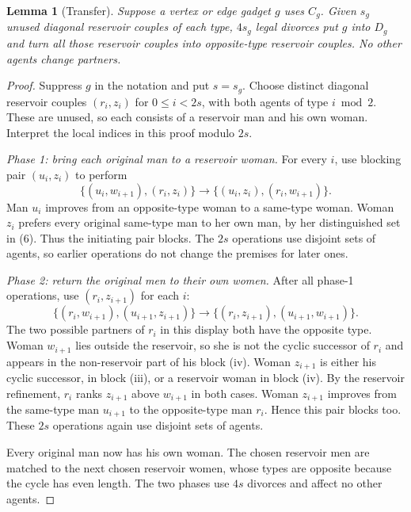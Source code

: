 \documentclass[11pt,letterpaper]{article}
\newtheorem{lemma}{Lemma}
\theoremstyle{definition}
\begin{document}
\begin{lemma}[Transfer]
Suppose a vertex or edge gadget $g$ uses $C_g$. Given $s_g$ unused diagonal reservoir couples of each type, $4s_g$ legal divorces put $g$ into $D_g$ and turn all those reservoir couples into opposite-type reservoir couples. No other agents change partners.
\end{lemma}
\begin{proof}
Suppress $g$ in the notation and put $s=s_g$. Choose distinct diagonal reservoir couples $(r_i,z_i)$ for $0\le i<2s$, with both agents of type $i\bmod 2$. These are unused, so each consists of a reservoir man and his own woman. Interpret the local indices in this proof modulo $2s$.

\noindent\textit{Phase 1: bring each original man to a reservoir woman.}
For every $i$, use blocking pair $(u_i,z_i)$ to perform
\begin{equation}\tag{11}
\{(u_i,w_{i+1}),(r_i,z_i)\}\longrightarrow\{(u_i,z_i),(r_i,w_{i+1})\}.
\end{equation}
Man $u_i$ improves from an opposite-type woman to a same-type woman. Woman $z_i$ prefers every original same-type man to her own man, by her distinguished set in (6). Thus the initiating pair blocks. The $2s$ operations use disjoint sets of agents, so earlier operations do not change the premises for later ones.

\noindent\textit{Phase 2: return the original men to their own women.}
After all phase-1 operations, use $(r_i,z_{i+1})$ for each $i$:
\begin{equation}\tag{12}
\{(r_i,w_{i+1}),(u_{i+1},z_{i+1})\}\longrightarrow\{(r_i,z_{i+1}),(u_{i+1},w_{i+1})\}.
\end{equation}
The two possible partners of $r_i$ in this display both have the opposite type. Woman $w_{i+1}$ lies outside the reservoir, so she is not the cyclic successor of $r_i$ and appears in the non-reservoir part of his block (iv). Woman $z_{i+1}$ is either his cyclic successor, in block (iii), or a reservoir woman in block (iv). By the reservoir refinement, $r_i$ ranks $z_{i+1}$ above $w_{i+1}$ in both cases. Woman $z_{i+1}$ improves from the same-type man $u_{i+1}$ to the opposite-type man $r_i$. Hence this pair blocks too. These $2s$ operations again use disjoint sets of agents.

Every original man now has his own woman. The chosen reservoir men are matched to the next chosen reservoir women, whose types are opposite because the cycle has even length. The two phases use $4s$ divorces and affect no other agents.
\end{proof}
\end{document}
